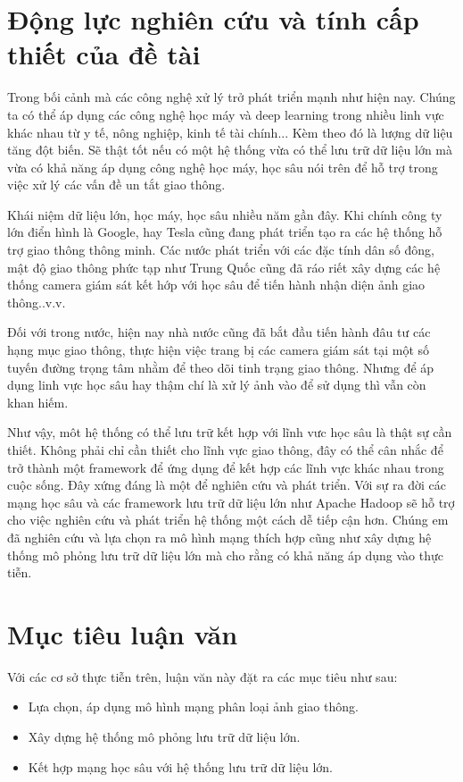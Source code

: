 \section*{Động lực nghiên cứu và tính cấp thiết của đề tài}
	Trong bối cảnh mà các công nghệ xử lý trở phát triển mạnh như hiện nay. Chúng ta có thể áp dụng các công nghệ học máy và deep learning trong nhiều linh vực khác nhau từ y tế, nông nghiệp, kinh tế tài chính... Kèm theo đó là lượng dữ liệu tăng đột biến. Sẽ thật tốt nếu có một hệ thống vừa có thể lưu trữ dữ liệu lớn mà vừa có khả năng áp dụng công nghệ học máy, học sâu nói trên để hỗ trợ trong việc xử lý các vấn đề un tắt giao thông.\par 
	Khái niệm dữ liệu lớn, học máy, học sâu nhiều năm gần đây. Khi chính công ty lớn điển hình là Google, hay Tesla cũng đang phát triển tạo ra các hệ thống hỗ trợ giao thông thông minh. Các nước phát triển với các đặc tính dân số đông, mật độ giao thông phức tạp như Trung Quốc cũng đã ráo riết xây dựng các hệ thống camera giám sát kết hớp với học sâu để tiến hành nhận diện ảnh giao thông..v.v.\par 
	Đối với trong nước, hiện nay nhà nước cũng đã bắt đầu tiến hành đâu tư các hạng mục giao thông, thực hiện việc trang bị các camera giám sát tại một số tuyến đường trọng tâm nhằm để theo dõi tinh trạng giao thông. Nhưng để áp dụng linh vực học sâu hay thậm chí là xử lý ảnh vào để sử dụng thì vẫn còn khan hiếm.\par 
	Như vậy, môt hệ thống có thể lưu trữ kết hợp với lĩnh vưc học sâu là thật sự cần thiết. Không phải chỉ cần thiết cho lĩnh vực giao thông, đây có thể cân nhắc để trở thành một framework để ứng dụng để kết hợp các lĩnh vực khác nhau trong cuộc sống. Đây xứng đáng là một để nghiên cứu và phát triển. Với sự ra đời các mạng học sâu và các framework lưu trữ dữ liệu lớn như Apache Hadoop sẽ hỗ trợ cho việc nghiên cứu và phát triển hệ thống một cách dễ tiếp cận hơn. Chúng em đã nghiên cứu và lựa chọn ra mô hình mạng thích hợp cũng như xây dựng hệ thống mô phỏng lưu trữ dữ liệu lớn mà cho rằng có khả năng áp dụng vào thực tiễn.
	
\section*{Mục tiêu luận văn}		
Với các cơ sở thực tiễn trên, luận văn này đặt ra các mục tiêu như sau:
\begin{itemize}
	\item Lựa chọn, áp dụng mô hình mạng phân loại ảnh giao thông.
	\item Xây dựng hệ thống mô phỏng lưu trữ dữ liệu lớn.
	\item Kết hợp mạng học sâu với hệ thống lưu trữ dữ liệu lớn.
\end{itemize}

